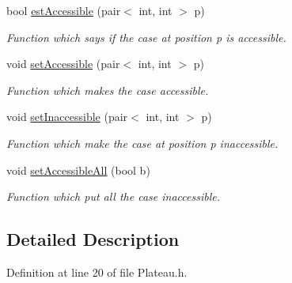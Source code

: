 \begin{DoxyCompactItemize}
bool \hyperlink{class_plateau_a1a346e3ae645072d870578e9713578b8}{estAccessible} (pair$<$ int, int $>$ p)
\begin{DoxyCompactList}\small\item\em Function which says if the case at position p is accessible. \item\end{DoxyCompactList}\item 
void \hyperlink{class_plateau_a74b4f5cf49d1f4f549f786bca559062a}{setAccessible} (pair$<$ int, int $>$ p)
\begin{DoxyCompactList}\small\item\em Function which makes the case accessible. \item\end{DoxyCompactList}\item 
\hypertarget{class_plateau_a042993d8abf6ef4f29fa96d7a7ae3de1}{
void \hyperlink{class_plateau_a042993d8abf6ef4f29fa96d7a7ae3de1}{setInaccessible} (pair$<$ int, int $>$ p)}
\label{class_plateau_a042993d8abf6ef4f29fa96d7a7ae3de1}

\begin{DoxyCompactList}\small\item\em Function which make the case at position p inaccessible. \item\end{DoxyCompactList}\item 
\hypertarget{class_plateau_ae881545e521dd4a2e9e9cb802425d8d0}{
void \hyperlink{class_plateau_ae881545e521dd4a2e9e9cb802425d8d0}{setAccessibleAll} (bool b)}
\label{class_plateau_ae881545e521dd4a2e9e9cb802425d8d0}

\begin{DoxyCompactList}\small\item\em Function which put all the case inaccessible. \item\end{DoxyCompactList}\end{DoxyCompactItemize}


\subsection{Detailed Description}


Definition at line 20 of file Plateau.h.



